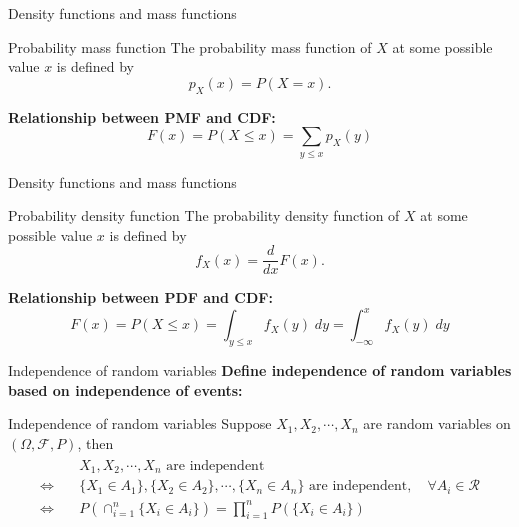 \documentclass [aspectratio=169]{beamer}
\newcommand{\mc}{\mathcal}
\begin{document}
\begin{frame}{Density functions and mass functions}
    \begin{block}{Probability mass function}
    The probability mass function of $X$ at some possible value $x$ is defined by
    $$ 
    p_X(x) = P(X = x).
    $$
    \end{block}
    \vspace{0.1in}
    \textbf{Relationship between PMF and CDF:}\\
    $$
    F(x) = P(X \le x) = \sum_{y \le x}p_X(y)
    $$ 
    \vspace{0.1in}
    \vspace{0.5in}
\end{frame}


\begin{frame}{Density functions and mass functions}
     \begin{block}{Probability density function}
    The probability density function of $X$ at some possible value $x$ is defined by
    $$ 
    f_X(x) = \dfrac{d}{dx}F(x).
    $$
    \end{block}
    \vspace{0.1in}
    \textbf{Relationship between PDF and CDF:}\\
    $$
    F(x) = P(X \le x) = \int_{y \le x}f_X(y)\; dy = \int_{-\infty}^x f_X(y)\; dy
    $$ 
    \vspace{0.1in}
\end{frame}

    

\begin{frame}{Independence of random variables}
    \textbf{Define independence of random variables based on independence of events:}\\
    \begin{block}{Independence of random variables}
        Suppose $X_1, X_2, \cdots, X_n$ are random variables on $(\Omega, \mc{F}, P)$, then 
        \begin{eqnarray*}
        \begin{aligned}
             & X_1, X_2, \cdots, X_n \text{ are independent} \\ \Leftrightarrow \quad & \{X_1 \in A_1\}, \{X_2 \in A_2\},  \cdots, \{X_n \in A_n\} \text{ are independent}, \quad \forall A_i \in \mc{R} \\
             \Leftrightarrow \quad & P(\cap_{i=1}^n \{X_i \in A_i\}) = \prod_{i = 1}^n P(\{X_i \in A_i\})
        \end{aligned}
        \end{eqnarray*}
    \end{block}
\end{frame}
\end{document}
